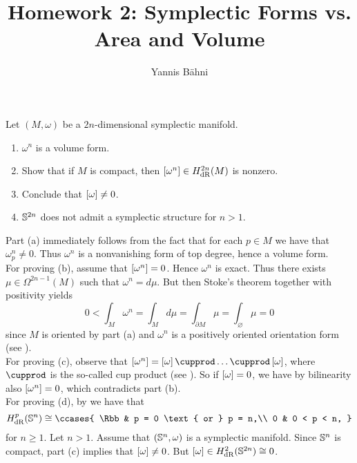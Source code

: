 

\title{Homework 2: Symplectic Forms vs. Area and Volume}
\author{Yannis B\"ahni}
\address[Yannis B\"ahni]{University of Zurich, R\"amistrasse 71, 8006 Zurich}



\maketitle
\thispagestyle{fancy}
\setcounter{section}{1}

\begin{exercise}
	\label{ex:1}
Let $(M,\omega)$ be a $2n$-dimensional symplectic manifold. 
\begin{enumerate}[label = \textup{(}\alph*\textup{)}]
\item $\omega^n$ is a volume form.
\item Show that if $M$ is compact, then $\sbr[0]{\omega^n} \in H_{\dRrm}^{2n}(M)$ is nonzero.
\item Conclude that $\sbr[0]{\omega} \neq 0$.
\item $\mathbb{S}^{2n}$ does not admit a symplectic structure for $n > 1$.
\end{enumerate}
\end{exercise}

\begin{solution}
	Part (a) immediately follows from the fact that for each $p \in M$ we have that $\omega_p^n \neq 0$. Thus $\omega^n$ is a nonvanishing form of top degree, hence a volume form.\\
	For proving (b), assume that $\sbr[0]{\omega^n} = 0$. Hence $\omega^n$ is exact. Thus there exists $\mu \in \Omega^{2n - 1}(M)$ such that $\omega^n = d\mu$. But then Stoke's theorem \cite[411]{lee:smooth_manifolds:2013} together with positivity \cite[407]{lee:smooth_manifolds:2013} yields
	\begin{equation*}
		0 < \int_{M} \omega^n = \int_M d\mu = \int_{\partial M} \mu	= \int_\varnothing \mu = 0
	\end{equation*}
	\noindent since $M$ is oriented by part (a) and $\omega^n$ is a positively oriented orientation form (see \cite[381]{lee:smooth_manifolds:2013}).\\
	For proving (c), observe that $\sbr[0]{\omega^n} = \sbr[0]{\omega} \cupprod \dots \cupprod \sbr[0]{\omega}$, where $\cupprod$ is the so-called cup product (see \cite[464]{lee:smooth_manifolds:2013}). So if $\sbr[0]{\omega} = 0$, we have by bilinearity also $\sbr[0]{\omega^n} = 0$, which contradicts part (b).\\
For proving (d), by \cite[450]{lee:smooth_manifolds:2013} we have that 
\begin{equation*}
	H_{\dRrm}^p(\Sbb^n) \cong \ccases{
		\Rbb & p = 0 \text{ or } p = n,\\
		0 & 0 < p < n,
	}
\end{equation*}
\noindent for $n \geq 1$. Let $n > 1$. Assume that $(\mathbb{S}^n, \omega)$ is a symplectic manifold. Since $\mathbb{S}^n$ is compact, part (c) implies that $\sbr[0]{\omega} \neq 0$. But $\sbr[0]{\omega} \in H_{\dRrm}^2(\Sbb^{2n}) \cong 0$.
\end{solution}

